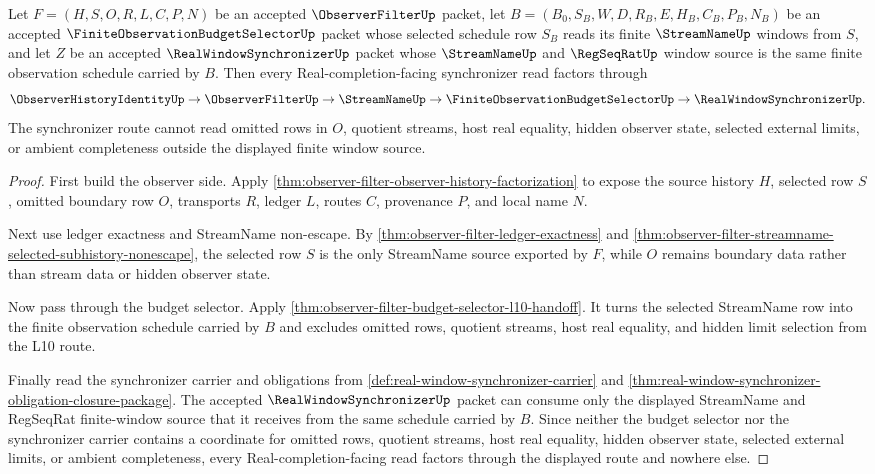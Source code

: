 \begin{theorem}
\label{thm:observer-filter-real-window-synchronizer-handoff}
Let $F=(H,S,O,R,L,C,P,N)$ be an accepted $\ObserverFilterUp$ packet, let $B=(B_0,S_B,W,D,R_B,E,H_B,C_B,P_B,N_B)$ be an accepted $\FiniteObservationBudgetSelectorUp$ packet whose selected schedule row $S_B$ reads its finite $\StreamNameUp$ windows from $S$, and let $Z$ be an accepted $\RealWindowSynchronizerUp$ packet whose $\StreamNameUp$ and $\RegSeqRatUp$ window source is the same finite observation schedule carried by $B$. Then every Real-completion-facing synchronizer read factors through
$$
\ObserverHistoryIdentityUp \to \ObserverFilterUp \to \StreamNameUp \to \FiniteObservationBudgetSelectorUp \to \RealWindowSynchronizerUp.
$$
The synchronizer route cannot read omitted rows in $O$, quotient streams, host real equality, hidden observer state, selected external limits, or ambient completeness outside the displayed finite window source.
\end{theorem}
\begin{proof}
First build the observer side. Apply \autoref{thm:observer-filter-observer-history-factorization} to expose the source history $H$, selected row $S$, omitted boundary row $O$, transports $R$, ledger $L$, routes $C$, provenance $P$, and local name $N$.

Next use ledger exactness and StreamName non-escape. By \autoref{thm:observer-filter-ledger-exactness} and \autoref{thm:observer-filter-streamname-selected-subhistory-nonescape}, the selected row $S$ is the only StreamName source exported by $F$, while $O$ remains boundary data rather than stream data or hidden observer state.

Now pass through the budget selector. Apply \autoref{thm:observer-filter-budget-selector-l10-handoff}. It turns the selected StreamName row into the finite observation schedule carried by $B$ and excludes omitted rows, quotient streams, host real equality, and hidden limit selection from the L10 route.

Finally read the synchronizer carrier and obligations from \autoref{def:real-window-synchronizer-carrier} and \autoref{thm:real-window-synchronizer-obligation-closure-package}. The accepted $\RealWindowSynchronizerUp$ packet can consume only the displayed StreamName and RegSeqRat finite-window source that it receives from the same schedule carried by $B$. Since neither the budget selector nor the synchronizer carrier contains a coordinate for omitted rows, quotient streams, host real equality, hidden observer state, selected external limits, or ambient completeness, every Real-completion-facing read factors through the displayed route and nowhere else.
\end{proof}

